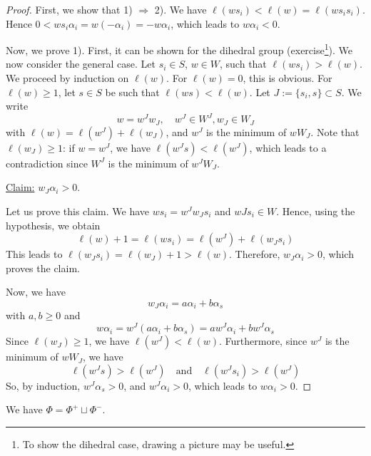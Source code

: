 \begin{proof}
First, we show that 1) $\Rightarrow$ 2). We have $\ell (w s_i) < \ell (w) = \ell (w s_i s_i)$. Hence $0 < w s_i \alpha_i = w (-\alpha_i) = - w \alpha_i$, which leads to $w \alpha_i <0$.

Now, we prove 1). First, it can be shown for the dihedral group (exercise\footnote{To show the dihedral case, drawing a picture may be useful.}). We now consider the general case. Let $s_i \in S$, $w\in W$, such that $\ell(ws_i) > \ell(w)$. We proceed by induction on $\ell (w)$. For $\ell (w) =0$, this is obvious. For $\ell (w) \ge 1$, let $s \in S$ be such that $\ell (w s) < \ell (w)$. Let $J:= \{s_i, s \} \subset S$. We write
\begin{equation}
w = w^J w_J, \quad w^J \in W^J, w_J \in W_J
\end{equation} with $\ell(w) = \ell (w^J ) + \ell (w_J)$, and $w^J$ is the minimum of $w W_J$. Note that $\ell (w_J) \ge 1$: if $w = w^J$, we have $\ell (w^J s) < \ell (w^J)$, which leads to a contradiction since $W^J$ is the minimum of $w^J W_J$.

\underline{Claim:} $w_J \alpha_i > 0$.

Let us prove this claim. We have $w s_i  = w^J w_J s_i$ and $wJ s_i \in W$. Hence, using the hypothesis, we obtain
\begin{equation}
\ell (w) +1 = \ell (w s_i) = \ell (w^J) + \ell (w_J s_i)
\end{equation} This leads to $\ell (w_J s_i) = \ell (w_J) + 1 > \ell (w)$. Therefore, $w_J \alpha_i > 0$, which proves the claim.

Now, we have
\begin{equation}
w_J \alpha_i = a \alpha_i + b \alpha_s
\end{equation} with $a, b \ge 0$ and
\begin{equation}
w \alpha_i = w^J (a \alpha_i + b \alpha_s ) = a w^J \alpha_i + b w^J \alpha_s
\end{equation} Since $\ell (w_J) \ge 1$, we have $\ell (w^J) < \ell (w)$. Furthermore, since $w^J$ is the minimum of $w W_J$, we have
\begin{equation}
\ell (w^J s) > \ell (w^J)  \quad \text{and} \quad \ell (w^J s_i) > \ell (w^J)
\end{equation} So, by induction, $w^J \alpha_s > 0$, and $w^J \alpha_i > 0$, which leads to $w \alpha_i > 0$.


\end{proof}

\begin{corollary}
We have $\Phi = \Phi^+ \sqcup \Phi^-$.
\end{corollary}

